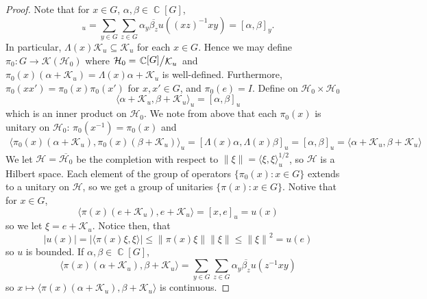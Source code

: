 \documentclass[11pt, a4paper]{memoir}
\DeclareMathOperator{\C}{{\mathbb{C}}}
\newcommand{\norm}[1]{\ensuremath{\left\lVert#1\right\rVert}}
\theoremstyle{change}
\theoremstyle{plain}
\theoremstyle{nonumberplain}
\newtheorem{proof}{Proof}
\newcommand{\quot}[2]{\mathchoice{\left.\raisebox{0.14em}{$#1$}\middle/\raisebox{-0.14em}{$#2$}\right.}
                                 {\left.\raisebox{0.08em}{$#1$}\middle/\raisebox{-0.08em}{$#2$}\right.}
                                 {\left.\raisebox{0.03em}{$#1$}\middle/\raisebox{-0.03em}{$#2$}\right.}
                                 {\left.\raisebox{0em}{$#1$}\middle/\raisebox{0em}{$#2$}\right.}}
\numberwithin{equation}{section}
\begin{document}
\begin{proof}
    Note that for $x\in G$, $\alpha,\beta\in\C[G]$,
    \begin{equation*}
        [\Lambda(x)\alpha,\Lambda(x)\beta]_u = \sum_{y\in G}\sum_{z\in G}\alpha_y\overline{\beta_z}u((xz)^{-1}xy)=[\alpha,\beta]_y.
    \end{equation*}
    In particular, $\Lambda(x)\mathcal{K}_u\subseteq\mathcal{K}_u$ for each $x\in G$.
    Hence we may define $\pi_0:G\to\mathcal{K}(\mathcal{H}_0)$ where $\mathcal{H}_0=\quot{\C[G]}{\mathcal{K}_u}$ and $\pi_0(x)(\alpha+\mathcal{K}_u)=\Lambda(x)\alpha+\mathcal{K}_u$ is well-defined.
    Furthermore, $\pi_0(xx')=\pi_0(x)\pi_0(x')$ for $x,x'\in G$, and $\pi_0(e)=I$.
    Define on $\mathcal{H}_0\times\mathcal{H}_0$
    \begin{equation*}
        \langle\alpha+\mathcal{K}_u,\beta+\mathcal{K}_u\rangle_u=[\alpha,\beta]_u
    \end{equation*}
    which is an inner product on $\mathcal{H}_0$.
    We note from above that each $\pi_0(x)$ is unitary on $\mathcal{H}_0$: $\pi_0(x^{-1})=\pi_0(x)$ and
    \begin{align*}
        \langle \pi_0(x)(\alpha+\mathcal{K}_u),\pi_0(x)(\beta+\mathcal{K}_u)\rangle_u = [\Lambda(x)\alpha,\Lambda(x)\beta]_u = [\alpha,\beta]_u =\langle\alpha+\mathcal{K}_u,\beta+\mathcal{K}_u\rangle
    \end{align*}
    We let $\mathcal{H}=\overline{\mathcal{H}_0}$ be the completion with respect to $\norm{\xi}=\langle\xi,\xi\rangle_u^{1/2}$, so $\mathcal{H}$ is a Hilbert space.
    Each element of the group of operators $\{\pi_0(x):x\in G\}$ extends to a unitary on $\mathcal{H}$, so we get a group of unitaries $\{\pi(x):x\in G\}$.
    Notive that for $x\in G$,
    \begin{equation*}
        \langle\pi(x)(e+\mathcal{K}_u),e+\mathcal{K}_u\rangle=[x,e]_u=u(x)
    \end{equation*}
    so we let $\xi=e+\mathcal{K}_u$.
    Notice then, that
    \begin{equation*}
        |u(x)|=|\langle\pi(x)\xi,\xi\rangle|\leq\norm{\pi(x)\xi}\norm{\xi}\leq\norm{\xi}^2=u(e)
    \end{equation*}
    so $u$ is bounded.
    If $\alpha,\beta\in\C[G]$,
    \begin{equation*}
        \langle\pi(x)(\alpha+\mathcal{K}_u),\beta+\mathcal{K}_u\rangle=\sum_{y\in G}\sum_{z\in G}\alpha_y\overline{\beta_z}u(z^{-1}xy)
    \end{equation*}
    so $x\mapsto\langle\pi(x)(\alpha+\mathcal{K}_u),\beta+\mathcal{K}_u\rangle$ is continuous.
    

\end{proof}
\end{document}
